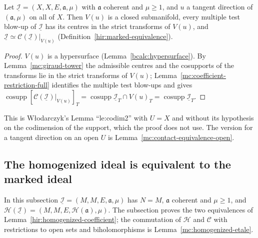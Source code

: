 \begin{lemma}
\label{mc:contact-equivalence}
\leanok
Let \(\underline{\mathcal I}=(X,X,E,\mathfrak a,\mu)\) with \(\mathfrak a\) coherent and \(\mu\ge1\), and \(u\) a tangent direction of \((\mathfrak a,\mu)\) on all of \(X\). Then
\(V(u)\) is a closed submanifold, every multiple test blow-up of \(\underline{\mathcal I}\) has its centres in the strict transforms of \(V(u)\), and
\(\underline{\mathcal I}\simeq\mathcal C(\underline{\mathcal I})|_{V(u)}\) (Definition~\ref{hir:marked-equivalence}).
\end{lemma}
\begin{proof}
\leanok
\(V(u)\) is a hypersurface (Lemma~\ref{bcalc:hypersurface}). By Lemma~\ref{mc:giraud-tower} the admissible centres and the cosupports of the transforms lie in the
strict transforms of \(V(u)\); Lemma~\ref{mc:coefficient-restriction-full} identifies the multiple test blow-ups and gives
\(\operatorname{cosupp}[\mathcal C(\underline{\mathcal I})|_{V(u)}]_T=\operatorname{cosupp}\underline{\mathcal I}_T\cap V(u)_T=\operatorname{cosupp}\underline{\mathcal I}_T\).
\end{proof}
This is Włodarczyk's Lemma ``le:codim2'' with \(U=X\) and without its hypothesis on the codimension of the support, which the proof does not use. The version
for a tangent direction on an open \(U\) is Lemma~\ref{mc:contact-equivalence-open}.

\subsection{The homogenized ideal is equivalent to the marked ideal}

In this subsection \(\underline{\mathcal I}=(M,M,E,\mathfrak a,\mu)\) has \(N=M\), \(\mathfrak a\) coherent and \(\mu\ge1\), and
\(\mathcal H(\underline{\mathcal I})=(M,M,E,\mathcal H(\mathfrak a),\mu)\). The subsection proves the two equivalences of
Lemma~\ref{hir:homogenized-coefficient}; the commutation of \(\mathcal H\) and \(\mathcal C\) with restrictions to open sets and biholomorphisms is
Lemma~\ref{mc:homogenized-etale}.

